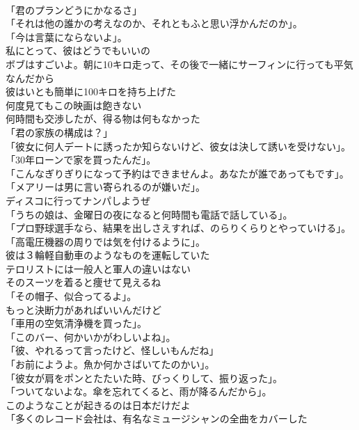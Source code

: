 \documentclass[8pt]{extreport}
\begin{document}
\begin{CJK}{UTF8}{min}
\\	「君のプランどうにかなるさ」	
\\	「それは他の誰かの考えなのか、それともふと思い浮かんだのか」。	
\\	「今は言葉にならないよ」。	
\\	私にとって、彼はどうでもいいの	
\\	ボブはすごいよ。朝に10キロ走って、その後で一緒にサーフィンに行っても平気なんだから	
\\	彼はいとも簡単に100キロを持ち上げた	
\\	何度見てもこの映画は飽きない	
\\	何時間も交渉したが、得る物は何もなかった	
\\	「君の家族の構成は？」	
\\	「彼女に何人デートに誘ったか知らないけど、彼女は決して誘いを受けない」。	
\\	「30年ローンで家を買ったんだ」。	
\\	「こんなぎりぎりになって予約はできませんよ。あなたが誰であってもです」。	
\\	「メアリーは男に言い寄られるのが嫌いだ」。	
\\	ディスコに行ってナンパしようぜ	
\\	「うちの娘は、金曜日の夜になると何時間も電話で話している」。	
\\	「プロ野球選手なら、結果を出しさえすれば、のらりくらりとやっていける」。	
\\	「高電圧機器の周りでは気を付けるように」。	
\\	彼は３輪軽自動車のようなものを運転していた	
\\	テロリストには一般人と軍人の違いはない	
\\	そのスーツを着ると痩せて見えるね	
\\	「その帽子、似合ってるよ」。	
\\	もっと決断力があればいいんだけど	
\\	「車用の空気清浄機を買った」。	
\\	「このバー、何かいかがわしいよね」。 
\\	「彼、やれるって言ったけど、怪しいもんだね」	
\\	「お前にようよ。魚か何かさばいてたのかい」。	
\\	「彼女が肩をポンとたたいた時、びっくりして、振り返った」。	
\\	「ついてないよな。傘を忘れてくると、雨が降るんだから」。	
\\	このようなことが起きるのは日本だけだよ	
\\	「多くのレコード会社は、有名なミュージシャンの全曲をカバーした

\end{CJK}
\end{document}
